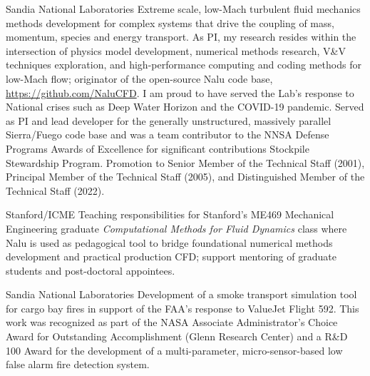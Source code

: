 \documentclass[letterpaper]{twentysecondcv_spd} %
\begin{document}
\begin{twenty}

	 {Sandia National Laboratories} {Extreme scale, low-Mach turbulent fluid mechanics methods development for complex systems that drive the coupling of mass, momentum, species and energy transport. As PI, my research resides within the intersection of physics model development, numerical methods research, V\&V techniques exploration, and high-performance computing and coding methods for low-Mach flow; originator of the open-source Nalu code base, \underline{https://github.com/NaluCFD}. I am proud to have served the Lab's response to National crises such as Deep Water Horizon and the COVID-19 pandemic. Served as PI and lead developer for the generally unstructured, massively parallel Sierra/Fuego code base and was a team contributor to the NNSA Defense Programs Awards of Excellence for significant contributions Stockpile Stewardship Program. Promotion to Senior Member of the Technical Staff (2001), Principal Member of the Technical Staff (2005), and Distinguished Member of the Technical Staff (2022).}
	
	 {Stanford/ICME} {Teaching responsibilities for Stanford's ME469 Mechanical Engineering graduate  \textit{Computational Methods for Fluid Dynamics} class where Nalu is used as pedagogical tool to bridge foundational numerical methods development and practical production CFD; support mentoring of graduate students and post-doctoral appointees.}
	
	 {Sandia National Laboratories}  {Development of a smoke transport simulation tool for cargo bay fires in support of the FAA's response to ValueJet Flight 592. This work was recognized as part of the NASA Associate Administrator's Choice Award for Outstanding Accomplishment (Glenn Research Center) and a R\&D 100 Award for the development of a multi-parameter, micro-sensor-based low false alarm fire detection system.}
  
\end{twenty}


\newpage %

\end{document}
